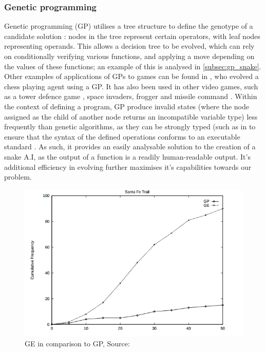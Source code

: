 \documentclass[british,10pt,a4paper]{article}
\begin{document}
\subsubsection{Genetic programming}
\label{subsec:gp}
Genetic programming (GP) utilises a tree structure to define the genotype of a candidate solution \cite{Cramer_undated-bj}: nodes in the tree represent certain operators, with leaf nodes representing operands. This allows a decision tree to be evolved, which can rely on conditionally verifying various functions, and applying a move depending on the values of these functions; an example of this is analysed in \autoref{subsec:gp_snake}. Other examples of applications of GPs to games can be found in \citet{Hauptman2005-zg}, who evolved a chess playing agent using a GP. It has also been used in other video games, such as a tower defence game \cite{Leong2013-pu}, space invaders, frogger and missile command \cite{Jia2015-jk}. Within the context of defining a program, GP produce invalid states (where the node assigned as the child of another node returns an incompatible variable type) less frequently than genetic algorithms, as they can be strongly typed (such as in \cite{Jia2015-jk} to ensure that the syntax of the defined operations conforms to an executable standard \cite{Chen2012-ei}. As such, it provides an easily analysable solution to the creation of a snake A.I, as the output of a function is a readily human-readable output. It's additional efficiency in evolving further maximises it's capabilities towards our problem.
\begin{figure}
\centering
	\includegraphics[width=12cm,keepaspectratio]{images/gp_vs_ge.png}
	\caption{GE in comparison to GP, Source: \cite{Michael_ONeill1999-zi}}
	\label{fig:gp_vs_ge}
	\vspace{-40pt}
\end{figure}
\end{document}
